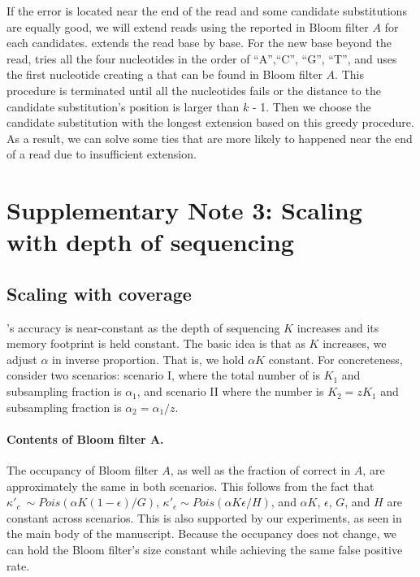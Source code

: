 \documentclass[10pt]{article}
\begin{document}
If the error is located near the end of the read and some candidate substitutions are equally good, we will extend reads using the \kmer reported in Bloom filter $A$ for each candidates.
\tool extends the read base by base.
For the new base beyond the read, \tool tries all the four nucleotides in the order of ``A'',``C'', ``G'', ``T'', and uses the first nucleotide creating a \kmer that can be found in Bloom filter $A$.
This procedure is terminated until all the nucleotides fails or the distance to the candidate substitution's position is larger than $k$ - 1.
Then we choose the candidate substitution with the longest extension based on this greedy procedure.
As a result, we can solve some ties that are more likely to happened near the end of a read due to insufficient extension. 

\section*{Supplementary Note 3: Scaling with depth of sequencing}

\subsection*{Scaling with coverage}
\tool's accuracy is near-constant as the depth of sequencing $K$ increases and its memory footprint is held constant.  The basic idea is that as $K$ increases, we adjust $\alpha$ in inverse proportion.  That is, we hold $\alpha K$ constant.  For concreteness, consider two scenarios: scenario I, where the total number of \kmers is $K_1$ and subsampling fraction is $\alpha_1$, and scenario II where the number is $K_2=z K_1$ and subsampling fraction is $\alpha_2 = \alpha_1 / z$.

\paragraph{Contents of Bloom filter A.} The occupancy of Bloom filter $A$, as well as the fraction of correct \kmers in $A$, are approximately the same in both scenarios.  This follows from the fact that $\kappa'_c ~ \sim Pois(\alpha K (1 - \epsilon) / G)$, $\kappa'_e \sim Pois(\alpha K \epsilon / H)$, and $\alpha K$, $\epsilon$, $G$, and $H$ are constant across scenarios.  This is also supported by our experiments, as seen in the main body of the manuscript.  Because the occupancy does not change, we can hold the Bloom filter's size constant while achieving the same false positive rate.
\end{document}
